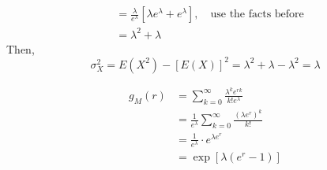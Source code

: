 \documentclass[UTF8]{article}
\begin{document}
\begin{enumerate}
\begin{equation*}
\begin{split}
                    &=\frac{\lambda}{e^\lambda}[\lambda e^\lambda+e^\lambda],\quad\text{use the facts before}\\
                    &=\lambda^2+\lambda
                \end{split}
            \end{equation*}
        Then,
        \begin{equation*}
            \sigma^2_X=E(X^2)-[E(X)]^2=\lambda^2+\lambda-\lambda^2=\lambda
        \end{equation*}
        
        \begin{equation*}
            \begin{split}
                g_M(r) &=\sum^\infty_{k=0}\frac{\lambda^k e^{rk}}{k!e^\lambda}\\
                &=\frac{1}{e^\lambda}\sum^\infty_{k=0}\frac{(\lambda e^r)^k}{k!}\\
                &=\frac{1}{e^\lambda}\cdot e^{\lambda e^r}\\
                &=\exp[\lambda(e^r-1)]
            \end{split}
        \end{equation*}
    \end{enumerate}
\end{document}
